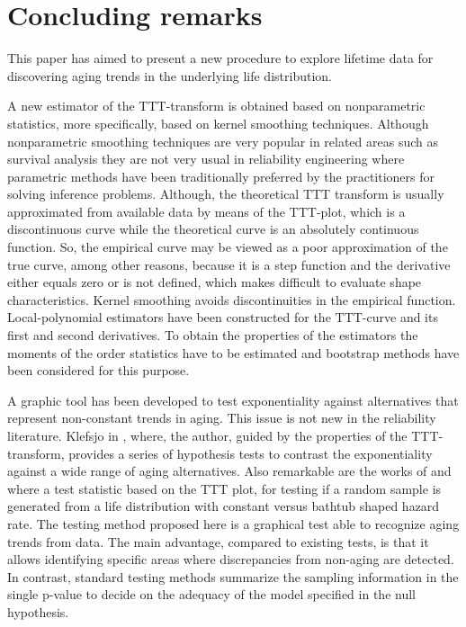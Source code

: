 \documentclass[preprint,12pt]{elsarticle}
\begin{document}
\section{Concluding remarks}

This paper has aimed to present a new procedure to explore lifetime data for discovering aging trends in the underlying life distribution. 

A new estimator of the TTT-transform is obtained based on nonparametric statistics, more specifically, based on kernel smoothing techniques. Although nonparametric smoothing techniques are very popular in related areas such as survival analysis they are not very usual in reliability engineering where parametric methods have been traditionally preferred by the practitioners for solving inference problems. 
Although, the theoretical TTT transform is usually approximated from available data by means of the TTT-plot, which is a discontinuous curve while the theoretical curve is an absolutely continuous function. So, the empirical curve may be viewed as a poor approximation of the true curve, among other reasons, because it is a step function and the derivative either equals zero or is not defined, which makes difficult to evaluate shape characteristics. Kernel smoothing avoids discontinuities in the empirical function.
Local-polynomial estimators have been constructed for the TTT-curve and its first and second derivatives. To obtain the properties of the estimators the moments of the order statistics have to be estimated and bootstrap methods have been considered for this purpose.


 
A graphic tool has been developed to test exponentiality against alternatives that represent non-constant trends in aging. This issue is not new in the reliability literature.  Klefsjo  in \cite{Klefsjo83a}, where, the author, guided by the properties of the TTT-transform, provides a series of hypothesis tests to contrast the exponentiality against a wide range of aging alternatives.  Also remarkable are the works of \cite{Bergman79} and \cite{A1987} where a test statistic based on the TTT plot, for testing if a random sample is generated from a life distribution with constant versus bathtub shaped hazard rate.
 The testing method proposed here is a graphical test able to recognize aging trends from data. The main advantage, compared to existing tests, is that it allows identifying specific areas where discrepancies from non-aging are detected. In contrast, standard testing methods summarize the sampling information in the single p-value to decide on the adequacy of the model specified in the null hypothesis.
\end{document}
